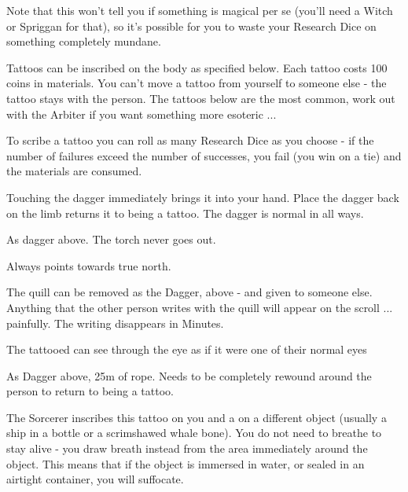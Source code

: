 {Note that this won't tell you if something is magical per se (you'll need a Witch or Spriggan for that), so it's possible for you to waste your Research Dice on something completely mundane.



Tattoos can be inscribed on the body as specified below.  Each tattoo costs 100 coins in materials. You can't move a tattoo from yourself to someone else - the tattoo stays with the person.  The tattoos below are the most common, work out with the Arbiter if you want something more esoteric ...

To scribe a tattoo you can roll as many Research Dice as you choose - if the number of failures exceed the number of successes, you fail (you win on a tie) and the materials are consumed.




Touching the dagger immediately brings it into your hand.  Place the dagger back on the limb returns it to being a tattoo.  The dagger is normal in all ways.



As dagger above.  The torch never goes out.


Always points towards true north.  


The quill can be removed as the Dagger, above - and given to someone else.  Anything that the other person writes with the quill will appear on the scroll ... painfully.  The writing disappears in Minutes.


The tattooed can see through the eye as if it were one of their normal eyes


As Dagger above, 25m of rope. Needs to be completely rewound around the person to return to being a tattoo.



The Sorcerer inscribes this tattoo on you and a  on a different object (usually a ship in a bottle or a scrimshawed whale bone).  You do not need to breathe to stay alive - you draw breath instead from the area immediately around the object.  This means that if the object is immersed in water, or sealed in an airtight container, you will suffocate.



}
